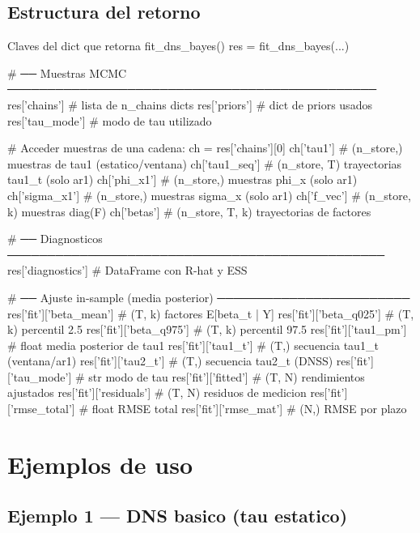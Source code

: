 \documentclass[12pt, a4paper]{article}
\theoremstyle{plain}
\theoremstyle{definition}
\theoremstyle{remark}
\begin{document}
\subsection{Estructura del retorno}

\begin{codigocaja}{Claves del dict que retorna fit\_dns\_bayes()}
res = fit_dns_bayes(...)

# ── Muestras MCMC ──────────────────────────────────────────────
res['chains']                  # lista de n_chains dicts
res['priors']                  # dict de priors usados
res['tau_mode']                # modo de tau utilizado

# Acceder muestras de una cadena:
ch = res['chains'][0]
ch['tau1']          # (n_store,)    muestras de tau1 (estatico/ventana)
ch['tau1_seq']      # (n_store, T)  trayectorias tau1_t (solo ar1)
ch['phi_x1']        # (n_store,)    muestras phi_x (solo ar1)
ch['sigma_x1']      # (n_store,)    muestras sigma_x (solo ar1)
ch['f_vec']         # (n_store, k)  muestras diag(F)
ch['betas']         # (n_store, T, k) trayectorias de factores

# ── Diagnosticos ───────────────────────────────────────────────
res['diagnostics']             # DataFrame con R-hat y ESS

# ── Ajuste in-sample (media posterior) ────────────────────────
res['fit']['beta_mean']        # (T, k)  factores E[beta_t | Y]
res['fit']['beta_q025']        # (T, k)  percentil 2.5%
res['fit']['beta_q975']        # (T, k)  percentil 97.5%
res['fit']['tau1_pm']          # float   media posterior de tau1
res['fit']['tau1_t']           # (T,)    secuencia tau1_t (ventana/ar1)
res['fit']['tau2_t']           # (T,)    secuencia tau2_t (DNSS)
res['fit']['tau_mode']         # str     modo de tau
res['fit']['fitted']           # (T, N)  rendimientos ajustados
res['fit']['residuals']        # (T, N)  residuos de medicion
res['fit']['rmse_total']       # float   RMSE total
res['fit']['rmse_mat']         # (N,)    RMSE por plazo
\end{codigocaja}

\section{Ejemplos de uso}

\subsection{Ejemplo 1 --- DNS basico (tau estatico)}
\end{document}
